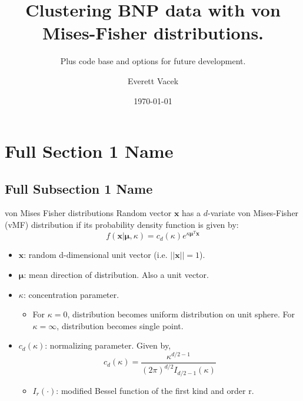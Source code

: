 \documentclass[
]{beamer}
\title[Short Presentation Title]{Clustering BNP data with von Mises-Fisher distributions.}
\subtitle[Short Presentation Subtitle]{Plus code base and options for future development.}
\author[E. Vacek]{Everett Vacek}
\date{\today}
\begin{document}
\begin{frame}[plain]
\maketitle
\end{frame}

\section[Short Section 1 Name]{Full Section 1 Name}
\subsection[Short Subsection 1 Name]{Full Subsection 1 Name}

\begin{frame}{von Mises Fisher distributions}%
Random vector $\boldsymbol{x}$ has a $d$-variate von Mises-Fisher (vMF) distribution if its probability density function is given by:
$$f(\boldsymbol{x}|\boldsymbol{\mu}, \kappa) = c_d(\kappa)e^{\kappa\boldsymbol{\mu}^T\mathbf{x}}$$
\begin{itemize}
  \item $\boldsymbol{x}$: random d-dimensional unit vector (i.e. $||\boldsymbol{x}|| = 1$).
  \item $\boldsymbol{\mu}$: mean direction of distribution. Also a unit vector.
  \item $\kappa$: concentration parameter.
  \begin{itemize}
    \item For $\kappa = 0$, distribution becomes uniform distribution on unit sphere. For $\kappa = \infty$, distribution becomes single point.
  \end{itemize}
  \item $c_d(\kappa)$: normalizing parameter. Given by,
  $$c_d(\kappa) = \frac{\kappa^{d/2-1}}{(2\pi)^{d/2}I_{d/2-1}(\kappa)}$$
  \begin{itemize}
      \item $I_r(\cdot)$: modified Bessel function of the first kind and order r.
  \end{itemize}
\end{itemize}
\end{frame}

\end{document}
